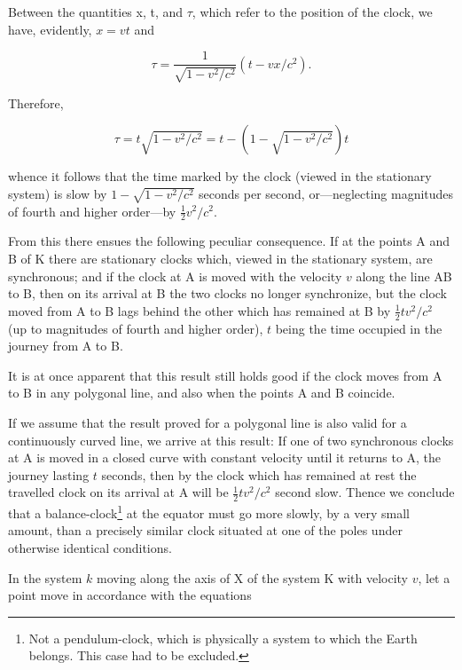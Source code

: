 \documentclass{article}
\begin{document}
Between the quantities x, t, and $\tau$, which refer to the position of the
clock, we have, evidently, $x=vt$ and

\[
\tau=\frac{1}{\sqrt{1-v^2/c^2}}(t-vx/c^2).
\]

\noindent
Therefore,

\[
\tau=t\sqrt{1-v^2/c^2}=t-(1-\sqrt{1-v^2/c^2})t
\]

\noindent
whence it follows that the time marked by the clock (viewed in the
stationary system) is slow by
$1-\sqrt{1-v^2/c^2}$
seconds per second,
or---neglecting magnitudes of fourth and higher order---by
$\frac{1}{2}v^2/c^2$.

From this there ensues the following peculiar consequence.  If at the
points A and B of K there are stationary clocks which, viewed in the
stationary system, are synchronous; and if the clock at A is moved
with the velocity $v$ along the line AB to B, then on its arrival at B
the two clocks no longer synchronize, but the clock moved from A to B
lags behind the other which has remained at B by
$\frac{1}{2}tv^2/c^2$
(up to
magnitudes of fourth and higher order), $t$ being the time occupied in
the journey from A to B.

It is at once apparent that this result still holds good if the clock
moves from A to B in any polygonal line, and also when the points A
and B coincide.

If we assume that the result proved for a polygonal line is also
valid for a continuously curved line, we arrive at this result:
If one of two synchronous clocks at A is moved in a closed curve
with constant velocity until it returns to A, the journey
lasting $t$ seconds, then by the clock which has remained at
rest the travelled clock on its arrival at A will be
$\frac{1}{2}tv^2/c^2$ second slow.  Thence we conclude that a
balance-clock\footnote{Not a pendulum-clock, which is physically
a system to which the Earth belongs.  This case had to be
excluded.} at the equator must go more slowly, by a very small
amount, than a precisely similar clock situated at one of the
poles under otherwise identical conditions.



In the system $k$ moving along the axis of X of the system K with
velocity $v$, let a point move in accordance with the equations
\end{document}
